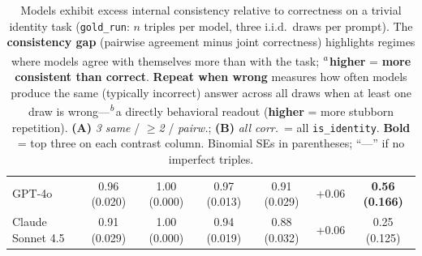 \begin{table}[t]
\begin{tabular}{@{}l ccc | ccc@{}}
\scriptsize GPT-4o & \scriptsize 0.96 (0.020) & \scriptsize 1.00 (0.000) & \scriptsize 0.97 (0.013) & \scriptsize 0.91 (0.029) & \scriptsize +0.06 & \scriptsize \textbf{0.56 (0.166)} \\
\scriptsize Claude Sonnet 4.5 & \scriptsize 0.91 (0.029) & \scriptsize 1.00 (0.000) & \scriptsize 0.94 (0.019) & \scriptsize 0.88 (0.032) & \scriptsize +0.06 & \scriptsize 0.25 (0.125) \\
\bottomrule
\end{tabular}
\caption{Models exhibit excess internal consistency relative to correctness on a trivial identity task (\texttt{gold\_run}: $n$ triples per model, three i.i.d.\ draws per prompt). The \textbf{consistency gap} (pairwise agreement minus joint correctness) highlights regimes where models agree with themselves more than with the task; \textsuperscript{\textit{a}}\,\textbf{higher} = \textbf{more consistent than correct}. \textbf{Repeat when wrong} measures how often models produce the same (typically incorrect) answer across all draws when at least one draw is wrong---\textsuperscript{\textit{b}}\,a directly behavioral readout (\textbf{higher} = more stubborn repetition). \textbf{(A)} \emph{3 same} / \emph{$\geq$2} / \emph{pairw.}; \textbf{(B)} \emph{all corr.}\ = all \texttt{is\_identity}. \textbf{Bold} = top three on each contrast column. Binomial SEs in parentheses; ``---'' if no imperfect triples.}
\label{tab:identity_repeat_agreement}
\end{table}
